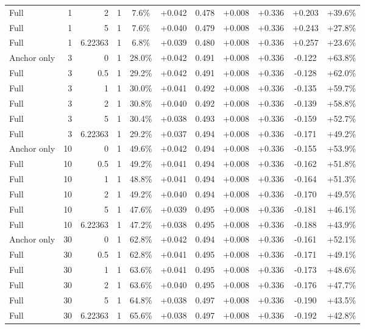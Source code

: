\begin{table}[htbp]
\begin{tabular}{lrrrccccccc}
Full & 1 & 2 & 1 & 7.6\% & +0.042 & 0.478 & +0.008 & +0.336 & +0.203 & +39.6\% \\
Full & 1 & 5 & 1 & 7.6\% & +0.040 & 0.479 & +0.008 & +0.336 & +0.243 & +27.8\% \\
Full & 1 & 6.22363 & 1 & 6.8\% & +0.039 & 0.480 & +0.008 & +0.336 & +0.257 & +23.6\% \\
Anchor only & 3 & 0 & 1 & 28.0\% & +0.042 & 0.491 & +0.008 & +0.336 & -0.122 & +63.8\% \\
Full & 3 & 0.5 & 1 & 29.2\% & +0.042 & 0.491 & +0.008 & +0.336 & -0.128 & +62.0\% \\
Full & 3 & 1 & 1 & 30.0\% & +0.041 & 0.492 & +0.008 & +0.336 & -0.135 & +59.7\% \\
Full & 3 & 2 & 1 & 30.8\% & +0.040 & 0.492 & +0.008 & +0.336 & -0.139 & +58.8\% \\
Full & 3 & 5 & 1 & 30.4\% & +0.038 & 0.493 & +0.008 & +0.336 & -0.159 & +52.7\% \\
Full & 3 & 6.22363 & 1 & 29.2\% & +0.037 & 0.494 & +0.008 & +0.336 & -0.171 & +49.2\% \\
Anchor only & 10 & 0 & 1 & 49.6\% & +0.042 & 0.494 & +0.008 & +0.336 & -0.155 & +53.9\% \\
Full & 10 & 0.5 & 1 & 49.2\% & +0.041 & 0.494 & +0.008 & +0.336 & -0.162 & +51.8\% \\
Full & 10 & 1 & 1 & 48.8\% & +0.041 & 0.494 & +0.008 & +0.336 & -0.164 & +51.3\% \\
Full & 10 & 2 & 1 & 49.2\% & +0.040 & 0.494 & +0.008 & +0.336 & -0.170 & +49.5\% \\
Full & 10 & 5 & 1 & 47.6\% & +0.039 & 0.495 & +0.008 & +0.336 & -0.181 & +46.1\% \\
Full & 10 & 6.22363 & 1 & 47.2\% & +0.038 & 0.495 & +0.008 & +0.336 & -0.188 & +43.9\% \\
Anchor only & 30 & 0 & 1 & 62.8\% & +0.042 & 0.494 & +0.008 & +0.336 & -0.161 & +52.1\% \\
Full & 30 & 0.5 & 1 & 62.8\% & +0.041 & 0.495 & +0.008 & +0.336 & -0.171 & +49.1\% \\
Full & 30 & 1 & 1 & 63.6\% & +0.041 & 0.495 & +0.008 & +0.336 & -0.173 & +48.6\% \\
Full & 30 & 2 & 1 & 63.6\% & +0.040 & 0.495 & +0.008 & +0.336 & -0.176 & +47.7\% \\
Full & 30 & 5 & 1 & 64.8\% & +0.038 & 0.497 & +0.008 & +0.336 & -0.190 & +43.5\% \\
Full & 30 & 6.22363 & 1 & 65.6\% & +0.038 & 0.497 & +0.008 & +0.336 & -0.192 & +42.8\% \\

\end{tabular}
\end{table}
